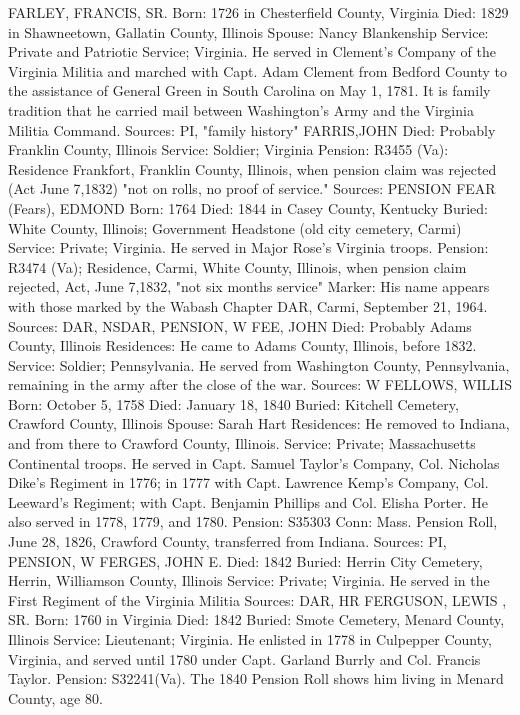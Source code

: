 FARLEY, FRANCIS, SR. 
Born: 1726 in Chesterfield County, Virginia 
Died: 1829 in Shawneetown, Gallatin County, Illinois 
Spouse: Nancy Blankenship 
Service: Private and Patriotic Service; Virginia. He served in Clement's Company of the Virginia Militia and marched with Capt. Adam Clement from Bedford County to the assistance of General Green in South Carolina on May 1, 1781. It is family tradition that he carried mail between Washington's Army and the Virginia Militia Command. 
Sources: PI, "family history" 
FARRIS,JOHN 
Died: Probably Franklin County, Illinois 
Service: Soldier; Virginia 
Pension: R3455 (Va): 
Residence Frankfort, Franklin County, Illinois, when pen­sion claim was rejected (Act June 7,1832) "not on rolls, no proof of service." 
Sources: PENSION 
FEAR (Fears), EDMOND 
Born: 1764 
Died: 1844 in Casey County, Kentucky Buried: White County, Illinois; Government Headstone (old city cemetery, Carmi) 
Service: Private; Virginia. He served in Major Rose's Virginia troops. 
Pension: R3474 (Va); Residence, Carmi, White County, Illinois, when pension claim rejected, Act, June 7,1832, "not six months service" 
Marker: His name appears with those marked by the Wabash Chapter DAR, Carmi, September 21, 1964. 
Sources: DAR, NSDAR, PENSION, W 
FEE, JOHN 
Died: Probably Adams County, Illinois 
Residences: He came to Adams County, Illinois, before 1832. 
Service: Soldier; Pennsylvania. He served from Washington County, Pennsylvania, remaining in the army after the close of the war. 
Sources: W 
FELLOWS, WILLIS 
Born: October 5, 1758 
Died: January 18, 1840 
Buried: Kitchell Cemetery, Crawford County, Illinois 
Spouse: Sarah Hart 
Residences: He removed to Indiana, and from there to Crawford County, Illinois. Service: Private; Massachusetts Continental troops. He served in Capt. Samuel Taylor's Company, Col. Nicholas Dike's Regiment in 1776; in 1777 with Capt. Lawrence Kemp's Company, Col. Leeward's Regiment; with Capt. Benjamin Phillips and Col. Elisha Porter. He also served in 1778, 1779, and 1780. 
Pension: S35303 Conn: Mass. Pension Roll, June 28, 1826, Crawford County, transferred from Indiana. 
Sources: PI, PENSION, W 
FERGES, JOHN E. 
Died: 1842 
Buried: Herrin City Cemetery, Herrin, Williamson County, Illinois 
Service: Private; Virginia. He served in the First Regiment of the Virginia Militia 
Sources: DAR, HR 
FERGUSON, LEWIS , SR. 
Born: 1760 in Virginia 
Died: 1842 Buried: Smote Cemetery, Menard County, Illinois 
Service: Lieutenant; Virginia. He enlisted in 1778 in Culpepper County, Virginia, 
and served until 1780 under Capt. Garland Burrly and Col. Francis Taylor. Pension: S32241(Va). The 1840 Pension Roll shows him living in Menard County, age 80. 
